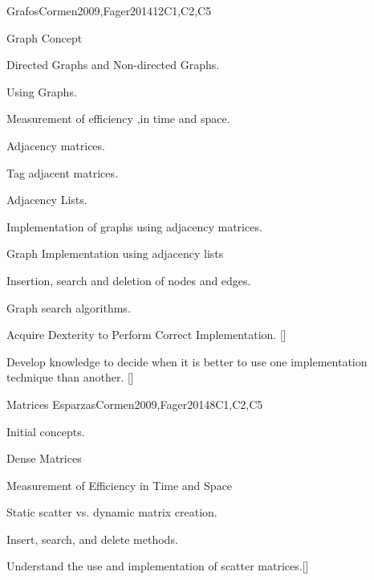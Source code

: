 \begin{syllabus}
\begin{unit}{Grafos}{}{Cormen2009,Fager2014}{12}{C1,C2,C5}
   \begin{topics}
    \item Graph Concept
    \item Directed Graphs and  Non-directed Graphs.
    \item Using Graphs.
    \item Measurement of efficiency ,in time and space.
    \item Adjacency matrices.
    \item Tag adjacent matrices.
    \item Adjacency Lists.
    \item Implementation of graphs using adjacency matrices.
    \item Graph Implementation using adjacency lists
    \item Insertion, search and deletion of nodes and edges.
    \item Graph search algorithms.
   \end{topics}
   \begin{learningoutcomes}
      \item  Acquire Dexterity to Perform Correct Implementation. [\Usage]
      \item  Develop knowledge to decide when it is better to use one implementation technique than another. [\Usage]   
   \end{learningoutcomes}
\end{unit}

\begin{unit}{Matrices Esparzas}{}{Cormen2009,Fager2014}{8}{C1,C2,C5}
   \begin{topics}
    \item  Initial concepts.
    \item  Dense Matrices
    \item  Measurement of Efficiency in Time and Space
    \item  Static scatter vs. dynamic matrix creation.
    \item  Insert, search, and delete methods.
   \end{topics}

\begin{learningoutcomes}
      \item Understand the use and implementation of scatter matrices.[\Assessment]
   \end{learningoutcomes}
\end{unit}


\end{syllabus}
